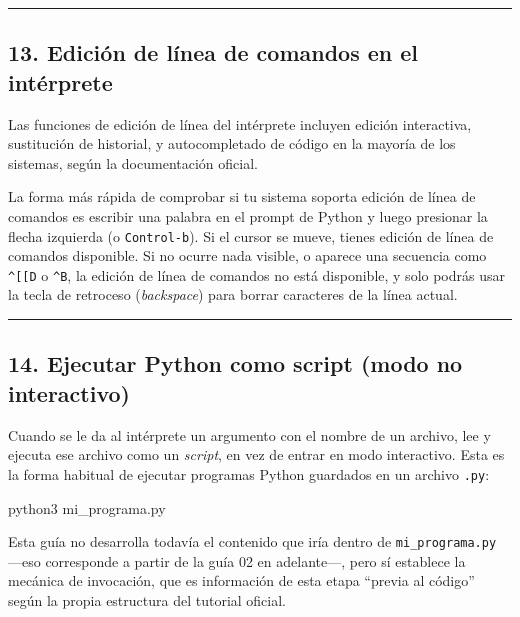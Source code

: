 \documentclass[
  doc,
  floatsintext,
  longtable,
  a4paper,
  nolmodern,
  notxfonts,
  notimes,
  12pt,
  colorlinks=true,linkcolor=blue,citecolor=blue,urlcolor=blue]{apa7}
\newenvironment{Shaded}{\begin{snugshade}}{\end{snugshade}}
\newcommand{\ExtensionTok}[1]{\textcolor[rgb]{0.00,0.23,0.31}{#1}}
\newcommand{\NormalTok}[1]{\textcolor[rgb]{0.00,0.23,0.31}{#1}}
\begin{document}
\begin{center}\rule{0.5\linewidth}{0.5pt}\end{center}

\subsection{13. Edición de línea de comandos en el
intérprete}\label{ediciuxf3n-de-luxednea-de-comandos-en-el-intuxe9rprete}

Las funciones de edición de línea del intérprete incluyen edición
interactiva, sustitución de historial, y autocompletado de código en la
mayoría de los sistemas, según la documentación oficial.

La forma más rápida de comprobar si tu sistema soporta edición de línea
de comandos es escribir una palabra en el prompt de Python y luego
presionar la flecha izquierda (o \texttt{Control-b}). Si el cursor se
mueve, tienes edición de línea de comandos disponible. Si no ocurre nada
visible, o aparece una secuencia como \texttt{\^{}{[}{[}D} o
\texttt{\^{}B}, la edición de línea de comandos no está disponible, y
solo podrás usar la tecla de retroceso (\emph{backspace}) para borrar
caracteres de la línea actual.

\begin{center}\rule{0.5\linewidth}{0.5pt}\end{center}

\subsection{14. Ejecutar Python como script (modo no
interactivo)}\label{ejecutar-python-como-script-modo-no-interactivo}

Cuando se le da al intérprete un argumento con el nombre de un archivo,
lee y ejecuta ese archivo como un \emph{script}, en vez de entrar en
modo interactivo. Esta es la forma habitual de ejecutar programas Python
guardados en un archivo \texttt{.py}:

\begin{Shaded}
\begin{Highlighting}[]
\ExtensionTok{python3}\NormalTok{ mi\_programa.py}
\end{Highlighting}
\end{Shaded}

Esta guía no desarrolla todavía el contenido que iría dentro de
\texttt{mi\_programa.py} ---eso corresponde a partir de la guía 02 en
adelante---, pero sí establece la mecánica de invocación, que es
información de esta etapa ``previa al código'' según la propia
estructura del tutorial oficial.
\end{document}
